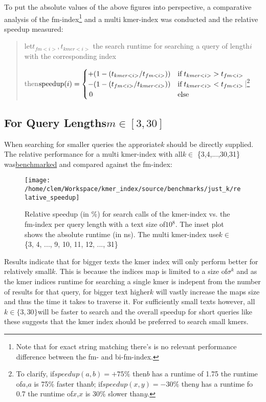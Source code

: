 To put the absolute values of the above figures into perspective,
a comparative analysis of the fm-index\footnote{Note that for exact string matching there's is no relevant performance
difference between the fm- and bi-fm-index.} and a multi kmer-index was conducted and the relative speedup measured:
\begin{verse}
let$t_{fm<i>},t_{kmer<i>}$ the search runtime for searching a query
of length$i$ with the corresponding index

then$\text{{speedup}}(i)=\begin{cases}
+(1-(t_{kmer<i>}/t_{fm<i>})) & \text{{if}\;}t_{kmer<i>}>t_{fm<i>}\\
-(1-(t_{fm<i>}/t_{kmer<i>})) & \text{{if}\;}t_{kmer<i>}<t_{fm<i>}\\
\,0 & \text{{else}}
\end{cases}$|\footnote{To clarify, if$speedup(a,b)=+75\%$ then$b$ has a runtime of 1.75
the runtime of$a$,$a$ is 75\% faster than$b$; if$speedup(x,y)=-30\%$
then$y$ has a runtime fo 0.7 the runtime of$x$,$x$ is 30\% slower
than$y$.}
\end{verse}

\subsection{For Query Lengths$m\in[3,30]$}

When searching for smaller queries the approriate$k$ should be directly
supplied. The relative performance for a multi kmer-index with all$k\in$
\{3,4,...,30,31\} was\href{https://github.com/google/benchmark}{benchmarked}
and compared against the fm-index:

\begin{figure}[H]
\texttt{[image: /home/clem/Workspace/kmer\_index/source/benchmarks/just\_k/relative\_speedup]}

\caption{Relative speedup (in \%) for search calls of the kmer-index vs. the
fm-index per query length with a text size of$10{{}^8}$. The inset
plot shows the absolute runtime (in ns). The multi kmer-index use$k\in$
\{3, 4, ..., 9, 10, 11, 12, ..., 31\}}
\end{figure}

Results indicate that for bigger texts the kmer index will only perform
better for relatively small$k$. This is because the indices map is
limited to a size of$\sigma^{k}$ and as the kmer indices runtime
for searching a single kmer is indepent from the number of results
for that query, for bigger text higher$k$ will vastly increase the
maps size and thus the time it takes to traverse it. For sufficiently
small texts however, all$k\in\{3,30\}$will be faster to search and
the overall speedup for short queries like these suggests that the
kmer index should be preferred to search small kmers.

